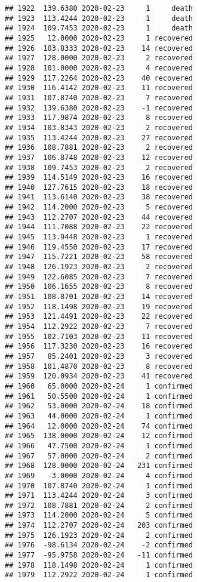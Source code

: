 \documentclass[
]{article}
\begin{document}
\begin{verbatim}
## 1922  139.6380 2020-02-23     1     death
## 1923  113.4244 2020-02-23     1     death
## 1924  109.7453 2020-02-23     1     death
## 1925   12.0000 2020-02-23     1 recovered
## 1926  103.8333 2020-02-23    14 recovered
## 1927  128.0000 2020-02-23     2 recovered
## 1928  101.0000 2020-02-23     4 recovered
## 1929  117.2264 2020-02-23    40 recovered
## 1930  116.4142 2020-02-23    11 recovered
## 1931  107.8740 2020-02-23     7 recovered
## 1932  139.6380 2020-02-23    -1 recovered
## 1933  117.9874 2020-02-23     8 recovered
## 1934  103.8343 2020-02-23     2 recovered
## 1935  113.4244 2020-02-23    27 recovered
## 1936  108.7881 2020-02-23     2 recovered
## 1937  106.8748 2020-02-23    12 recovered
## 1938  109.7453 2020-02-23     2 recovered
## 1939  114.5149 2020-02-23    16 recovered
## 1940  127.7615 2020-02-23    18 recovered
## 1941  113.6140 2020-02-23    38 recovered
## 1942  114.2000 2020-02-23     5 recovered
## 1943  112.2707 2020-02-23    44 recovered
## 1944  111.7088 2020-02-23    22 recovered
## 1945  113.9448 2020-02-23     1 recovered
## 1946  119.4550 2020-02-23    17 recovered
## 1947  115.7221 2020-02-23    58 recovered
## 1948  126.1923 2020-02-23     2 recovered
## 1949  122.6085 2020-02-23     7 recovered
## 1950  106.1655 2020-02-23     8 recovered
## 1951  108.8701 2020-02-23    14 recovered
## 1952  118.1498 2020-02-23    19 recovered
## 1953  121.4491 2020-02-23    22 recovered
## 1954  112.2922 2020-02-23     7 recovered
## 1955  102.7103 2020-02-23    11 recovered
## 1956  117.3230 2020-02-23    16 recovered
## 1957   85.2401 2020-02-23     3 recovered
## 1958  101.4870 2020-02-23     8 recovered
## 1959  120.0934 2020-02-23    41 recovered
## 1960   65.0000 2020-02-24     1 confirmed
## 1961   50.5500 2020-02-24     1 confirmed
## 1962   53.0000 2020-02-24    18 confirmed
## 1963   44.0000 2020-02-24     1 confirmed
## 1964   12.0000 2020-02-24    74 confirmed
## 1965  138.0000 2020-02-24    12 confirmed
## 1966   47.7500 2020-02-24     1 confirmed
## 1967   57.0000 2020-02-24     2 confirmed
## 1968  128.0000 2020-02-24   231 confirmed
## 1969   -3.0000 2020-02-24     4 confirmed
## 1970  107.8740 2020-02-24     1 confirmed
## 1971  113.4244 2020-02-24     3 confirmed
## 1972  108.7881 2020-02-24     2 confirmed
## 1973  114.2000 2020-02-24     5 confirmed
## 1974  112.2707 2020-02-24   203 confirmed
## 1975  126.1923 2020-02-24     2 confirmed
## 1976  -98.6134 2020-02-24    -2 confirmed
## 1977  -95.9758 2020-02-24   -11 confirmed
## 1978  118.1498 2020-02-24     1 confirmed
## 1979  112.2922 2020-02-24     1 confirmed

\end{verbatim}
\end{document}

